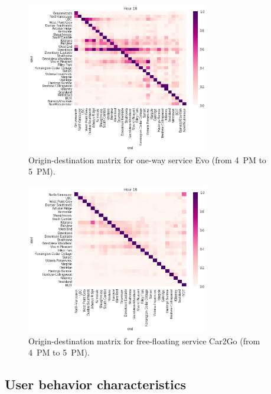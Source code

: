\begin{figure}[tbh]
\centering
\includegraphics[width=80mm]{destination_matrix/hour16.png}
\caption{Origin-destination matrix for one-way service Evo (from 4~PM to 5~PM).}
\label{fig:matrixEvo}
\end{figure}
%
\begin{figure}[tbh]
\centering
\includegraphics[width=80mm]{car2go_destination_matrix/hour16.png}
\caption{Origin-destination matrix for free-floating service Car2Go (from 4~PM to 5~PM).}
\label{fig:matrixCar2Go}
\end{figure}




\subsection{User behavior characteristics}
\label{sec:user-behavior}


